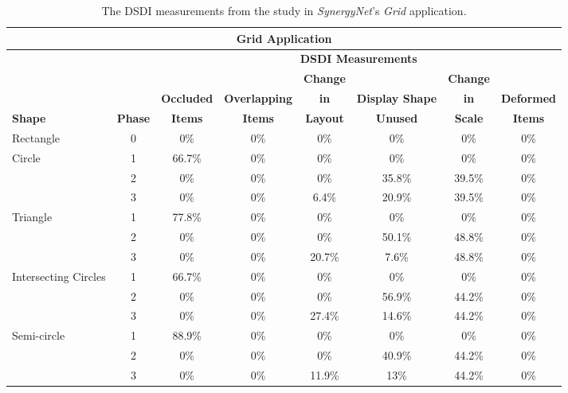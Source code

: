 \documentclass[twocolumn,compsoc]{cvm}
\newcommand{\smallline}{\arrayrulecolor{lightgray} \cline{2-8} \arrayrulecolor{black}}
\begin{document}
{\begin{table}[p]
	\centering
	\begin{tabular}{ | l | c | c | c | c | c | c | c | }	
	\hline
	\multicolumn{8}{|c|}{\textbf{Grid Application}} \\
	\hline
	& & \multicolumn{6}{c|}{\textbf{\ac{DSDI} Measurements}} \\
	\cline{3-8}
		& & & & \textbf{Change} & & \textbf{Change} & \\
		& & \textbf{Occluded} & \textbf{Overlapping} & \textbf{in} & \textbf{Display Shape} & \textbf{in} & \textbf{Deformed} \\
		\textbf{Shape} & \textbf{Phase} & \textbf{Items} & \textbf{Items} & \textbf{Layout} & \textbf{Unused} & \textbf{Scale} & \textbf{Items} \\ 
	\hline
		Rectangle & 0 & 0\% & 0\% & 0\% & 0\% & 0\% & 0\% \\  
	\hline
		\multirow{3}{*}{Circle} & 1 & 66.7\% & 0\% & 0\% & 0\% & 0\% & 0\% \\ \smallline
		& 2 & 0\% & 0\% & 0\% & 35.8\% & 39.5\% & 0\% \\ \smallline
		& 3 & 0\% & 0\% & 6.4\% & 20.9\% & 39.5\% & 0\% \\
	\hline
		\multirow{3}{*}{Triangle} & 1 & 77.8\% & 0\% & 0\% & 0\% & 0\% & 0\% \\ \smallline
		& 2 & 0\% & 0\% & 0\% & 50.1\% & 48.8\% & 0\% \\ \smallline
		& 3 & 0\% & 0\% & 20.7\% & 7.6\% & 48.8\% & 0\% \\
	\hline
		\multirow{3}{*}{Intersecting Circles} & 1 & 66.7\% & 0\% & 0\% & 0\% & 0\% & 0\% \\ \smallline
		& 2 & 0\% & 0\% & 0\% & 56.9\% & 44.2\% & 0\% \\ \smallline
		& 3 & 0\% & 0\% & 27.4\% & 14.6\% & 44.2\% & 0\% \\
	\hline
		\multirow{3}{*}{Semi-circle} & 1 & 88.9\% & 0\% & 0\% & 0\% & 0\% & 0\% \\ \smallline
		& 2 & 0\% & 0\% & 0\% & 40.9\% & 44.2\% & 0\% \\ \smallline
		& 3 & 0\% & 0\% & 11.9\% & 13\% & 44.2\% & 0\% \\ 
	\hline
	\end{tabular}
	\caption{The \ac{DSDI} measurements from the study in {\emph{SynergyNet}}'s {\emph{Grid}} application.}
	\label{tab:gridApp}
\end{table}

}
\end{document}
